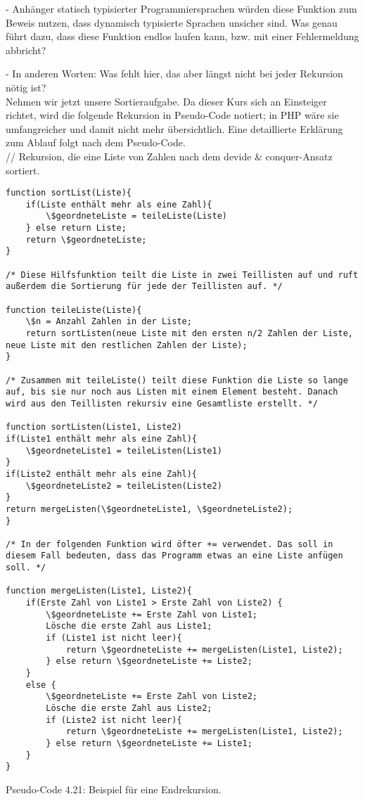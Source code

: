 -	Anhänger statisch typisierter Programmiersprachen würden diese Funktion zum Beweis nutzen, dass dynamisch typisierte Sprachen unsicher sind. Was genau führt dazu, dass diese Funktion endlos laufen kann, bzw. mit einer Fehlermeldung abbricht?

-	In anderen Worten: Was fehlt hier, das aber längst nicht bei jeder Rekursion nötig ist?\\

Nehmen wir jetzt unsere Sortieraufgabe. Da dieser Kurs sich an Einsteiger richtet, wird die folgende Rekursion in Pseudo-Code notiert; in PHP wäre sie umfangreicher und damit nicht mehr übersichtlich. Eine detaillierte Erklärung zum Ablauf folgt nach dem Pseudo-Code.\\

// Rekursion, die eine Liste von Zahlen nach dem devide \& conquer-Ansatz sortiert.\\

\begin{verbatim}
function sortList(Liste){
	if(Liste enthält mehr als eine Zahl){
		\$geordneteListe = teileListe(Liste)
	} else return Liste;
	return \$geordneteListe;
}

/* Diese Hilfsfunktion teilt die Liste in zwei Teillisten auf und ruft außerdem die Sortierung für jede der Teillisten auf. */

function teileListe(Liste){
	\$n = Anzahl Zahlen in der Liste;
	return sortListen(neue Liste mit den ersten n/2 Zahlen der Liste, neue Liste mit den restlichen Zahlen der Liste);
}

/* Zusammen mit teileListe() teilt diese Funktion die Liste so lange auf, bis sie nur noch aus Listen mit einem Element besteht. Danach wird aus den Teillisten rekursiv eine Gesamtliste erstellt. */

function sortListen(Liste1, Liste2)
if(Liste1 enthält mehr als eine Zahl){
	\$geordneteListe1 = teileListen(Liste1)
}
if(Liste2 enthält mehr als eine Zahl){
	\$geordneteListe2 = teileListen(Liste2)
} 
return mergeListen(\$geordneteListe1, \$geordneteListe2);
}  

/* In der folgenden Funktion wird öfter += verwendet. Das soll in diesem Fall bedeuten, dass das Programm etwas an eine Liste anfügen soll. */

function mergeListen(Liste1, Liste2){
	if(Erste Zahl von Liste1 > Erste Zahl von Liste2) {
		\$geordneteListe += Erste Zahl von Liste1;
		Lösche die erste Zahl aus Liste1;
		if (Liste1 ist nicht leer){
			return \$geordneteListe += mergeListen(Liste1, Liste2);
		} else return \$geordneteListe += Liste2;
	}
	else {
		\$geordneteListe += Erste Zahl von Liste2;
		Lösche die erste Zahl aus Liste2;
		if (Liste2 ist nicht leer){
			return \$geordneteListe += mergeListen(Liste1, Liste2);
		} else return \$geordneteListe += Liste1;
	}
}
\end{verbatim}
Pseudo-Code 4.21: Beispiel für eine Endrekursion.\\

